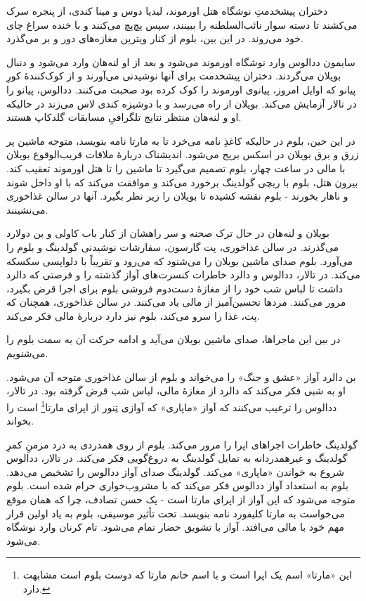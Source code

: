 \documentclass[12pt]{book}
\begin{document}
    دختران پیشخدمتِ نوشگاه هتل اورموند، لیدیا دوس و مینا کندی، از پنجره سرک می‌کشند تا دسته سوار نائب‌السلطنه را ببینند، سپس پچ‌پچ می‌کنند و با خنده سراغ چای خود می‌روند. در این بین، بلوم از کنار ویترین مغازه‌های دور و بر می‌گذرد.

    سایمون ددالوس وارد نوشگاه اورموند می‌شود و بعد از او لنه‌هان وارد می‌شود و دنبال بویلان می‌گردند. دختران پیشخدمت برای آنها نوشیدنی می‌آورند و از کوک‌کنندۀ کورِ پیانو که اوایل امروز، پیانوی اورموند را کوک کرده بود صحبت می‌کنند. ددالوس، پیانو را در تالار آزمایش می‌کند. بویلان از راه می‌رسد و با دوشیزه کندی لاس می‌زند در حالیکه او و لنه‌هان منتظر نتایج تلگرافیِ مسابقات گلدکاپ هستند.

    در این حین، بلوم در حالیکه کاغذِ نامه می‌خرد تا به مارتا نامه بنویسد، متوجه ماشین پر زرق و برق بویلان در اسکس بریج می‌شود. اندیشناک دربارۀ ملاقات قریب‌الوقوع بویلان با مالی در ساعت چهار، بلوم تصمیم می‌گیرد تا ماشین را تا هتل اورموند تعقیب کند. بیرون هتل، بلوم با ریچی گولدینگ برخورد می‌کند و موافقت می‌کند که با او داخل شوند و ناهار بخورند - بلوم نقشه کشیده تا بویلان را زیر نظر بگیرد. آنها در سالن غذاخوری می‌نشینند.

    بویلان و لنه‌هان در حال ترک صحنه و سر راهشان از کنار باب کاولی و بن دولارد می‌گذرند. در سالن غذاخوری، پت گارسون، سفارشات نوشیدنی گولدینگ و بلوم را می‌آورد. بلوم صدای ماشین بویلان را می‌شنود که می‌رود و تقریباً با دلواپسی سکسکه می‌کند. در تالار، ددالوس و دالرد خاطرات کنسرت‌های آواز گذشته را و فرصتی که دالرد داشت تا لباس شب خود را از مغازۀ دست‌دوم فروشی بلوم برای اجرا قرض بگیرد، مرور می‌کنند. مردها تحسین‌آمیز از مالی یاد می‌کنند. در سالن غذاخوری، همچنان که پت، غذا را سرو می‌کند، بلوم نیز دارد دربارۀ مالی فکر می‌کند.

    در بین این ماجراها، صدای ماشین بویلان می‌آید و ادامه حرکت آن به سمت بلوم را می‌شنویم.

    بن دالرد آواز «عشق و جنگ» را می‌خواند و بلوم از سالن غذاخوری متوجه آن می‌شود. او به شبی فکر می‌کند که دالرد از مغازۀ مالی، لباس شب قرض گرفته بود. در تالار، ددالوس را ترغیب می‌کنند که آواز «ماپاری» که آوازی تِنور از اپرای مارتا\footnote{این «مارتا» اسم یک اپرا است و با اسم خانم مارتا که دوست بلوم است مشابهت دارد.} است را بخواند.

    گولدینگ خاطرات اجراهای اپرا را مرور می‌کند. بلوم از روی همدردی به درد مزمنِ کمرِ گولدینگ و غیرهمدردانه به تمایل گولدینگ به دروغ‌گویی فکر می‌کند. در تالار، ددالوس شروع به خواندن «ماپاری» می‌کند. گولدینگ صدای آواز ددالوس را تشخیص می‌دهد. بلوم به استعداد آواز ددالوس فکر می‌کند که با مشروب‌خواری حرام شده است. بلوم متوجه می‌شود که این آواز از اپرای مارتا است - یک حسن تصادف، چرا که همان موقع می‌خواست به مارتا کلیفورد نامه بنویسد. تحت تأثیر موسیقی، بلوم به یاد اولین قرار مهم خود با مالی می‌افتد. آواز با تشویق حضار تمام می‌شود. تام کرنان وارد نوشگاه می‌شود.
\end{document}
